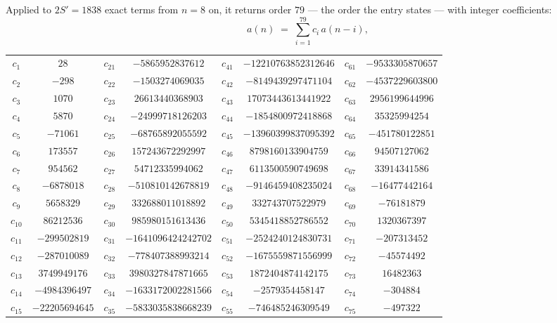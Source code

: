 \documentclass[11pt,a4paper]{article}
\theoremstyle{plain}
\theoremstyle{definition}
\begin{document}
Applied to $2S'=1838$ exact terms from $n=8$ on, it returns order $79$ --- the
order the entry states --- with integer coefficients:
\[
a(n)\;=\;\sum_{i=1}^{79}c_i\,a(n-i),
\]
\begin{center}\small
\begin{tabular}{cccccccc}
$c_{1}$ & $28$ & $c_{21}$ & $-5865952837612$ & $c_{41}$ & $-12210763852312646$ & $c_{61}$ & $-9533305870657$ \\
$c_{2}$ & $-298$ & $c_{22}$ & $-1503274069035$ & $c_{42}$ & $-8149439297471104$ & $c_{62}$ & $-4537229603800$ \\
$c_{3}$ & $1070$ & $c_{23}$ & $26613440368903$ & $c_{43}$ & $17073443613441922$ & $c_{63}$ & $2956199644996$ \\
$c_{4}$ & $5870$ & $c_{24}$ & $-24999718126203$ & $c_{44}$ & $-1854800972418868$ & $c_{64}$ & $35325994254$ \\
$c_{5}$ & $-71061$ & $c_{25}$ & $-68765892055592$ & $c_{45}$ & $-13960399837095392$ & $c_{65}$ & $-451780122851$ \\
$c_{6}$ & $173557$ & $c_{26}$ & $157243672292997$ & $c_{46}$ & $8798160133904759$ & $c_{66}$ & $94507127062$ \\
$c_{7}$ & $954562$ & $c_{27}$ & $54712335994062$ & $c_{47}$ & $6113500590749698$ & $c_{67}$ & $33914341586$ \\
$c_{8}$ & $-6878018$ & $c_{28}$ & $-510810142678819$ & $c_{48}$ & $-9146459408235024$ & $c_{68}$ & $-16477442164$ \\
$c_{9}$ & $5658329$ & $c_{29}$ & $332688011018892$ & $c_{49}$ & $332743707522979$ & $c_{69}$ & $-76181879$ \\
$c_{10}$ & $86212536$ & $c_{30}$ & $985980151613436$ & $c_{50}$ & $5345418852786552$ & $c_{70}$ & $1320367397$ \\
$c_{11}$ & $-299502819$ & $c_{31}$ & $-1641096424242702$ & $c_{51}$ & $-2524240124830731$ & $c_{71}$ & $-207313452$ \\
$c_{12}$ & $-287010089$ & $c_{32}$ & $-778407388993214$ & $c_{52}$ & $-1675559871556999$ & $c_{72}$ & $-45574492$ \\
$c_{13}$ & $3749949176$ & $c_{33}$ & $3980327847871665$ & $c_{53}$ & $1872404874142175$ & $c_{73}$ & $16482363$ \\
$c_{14}$ & $-4984396497$ & $c_{34}$ & $-1633172002281566$ & $c_{54}$ & $-2579354458147$ & $c_{74}$ & $-304884$ \\
$c_{15}$ & $-22205694645$ & $c_{35}$ & $-5833035838668239$ & $c_{55}$ & $-746485246309549$ & $c_{75}$ & $-497322$ \\

\end{tabular}
\end{center}
\end{document}

